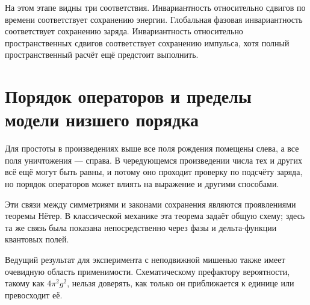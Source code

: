 На этом этапе видны три соответствия. Инвариантность относительно сдвигов по времени соответствует сохранению энергии. Глобальная фазовая инвариантность соответствует сохранению заряда. Инвариантность относительно пространственных сдвигов соответствует сохранению импульса, хотя полный пространственный расчёт ещё предстоит выполнить.

\section{Порядок операторов и пределы модели низшего порядка}

Для простоты в произведениях выше все поля рождения помещены слева, а все поля уничтожения — справа. В чередующемся произведении числа тех и других всё ещё могут быть равны, и потому оно проходит проверку по подсчёту заряда, но порядок операторов может влиять на выражение и другими способами.

\begin{classroomqa}
\end{classroomqa}


Эти связи между симметриями и законами сохранения являются проявлениями теоремы Нётер. В классической механике эта теорема задаёт общую схему; здесь та же связь была показана непосредственно через фазы и дельта-функции квантовых полей.

Ведущий результат для эксперимента с неподвижной мишенью также имеет очевидную область применимости. Схематическому префактору вероятности, такому как \(4\pi^2g^2\), нельзя доверять, как только он приближается к единице или превосходит её.

\begin{classroomqa}
\end{classroomqa}

